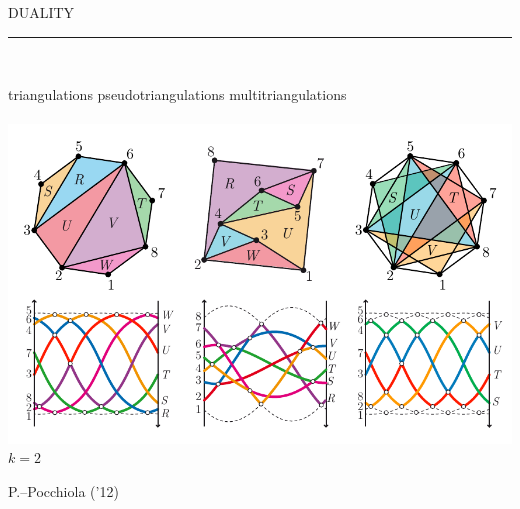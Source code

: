 \documentclass[12pt,titlepage,landscape,a4paper]{article}
\newcommand{\textemoyen}{\fontsize{23}{27}\selectfont}
\newenvironment{slide}[1]
{
\newpage
\begin{center}
{\blue \textemoyen \uppercase{#1}}\\
\end{center}
\vspace{-1cm}
\rule{\textwidth}{0.5 pt}\\
\vspace{-.8cm}
}
{\vspace*{-3cm}}
\newcommand{\violet}{\color{violet}} %
\newcommand{\blue}{\color{blue}} %
\newcommand{\papier}[1]{{\violet\fontsize{15}{20}\selectfont #1}} %
\begin{document}

\begin{slide}{Duality}
\hspace{1.6cm} triangulations \hspace{3.4cm} pseudotriangulations \hspace{2.5cm} multitriangulations\\
\vspace{-.5cm}\\
\vspace*{-2cm}
\hspace*{-.6cm}\includegraphics[scale=1.9]{geometricStructures7}
\vspace{-8.5cm} \\ \hspace*{25.7cm} ${k=2}$

\vspace{7.6cm}
\papier{P.--Pocchiola ('12)}

\vspace*{-3cm}
\end{slide}

%
%
\end{document}
